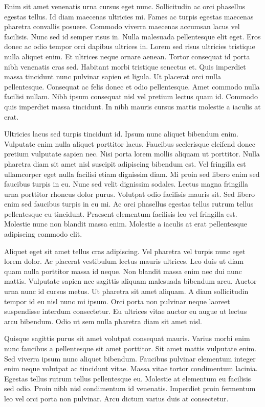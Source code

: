 Enim sit amet venenatis urna cursus eget nunc. Sollicitudin ac orci phasellus egestas tellus. Id diam maecenas ultricies mi. Fames ac turpis egestas maecenas pharetra convallis posuere. Commodo viverra maecenas accumsan lacus vel facilisis. Nunc sed id semper risus in. Nulla malesuada pellentesque elit eget. Eros donec ac odio tempor orci dapibus ultrices in. Lorem sed risus ultricies tristique nulla aliquet enim. Et ultrices neque ornare aenean. Tortor consequat id porta nibh venenatis cras sed. Habitant morbi tristique senectus et. Quis imperdiet massa tincidunt nunc pulvinar sapien et ligula. Ut placerat orci nulla pellentesque. Consequat ac felis donec et odio pellentesque. Amet commodo nulla facilisi nullam. Nibh ipsum consequat nisl vel pretium lectus quam id. Commodo quis imperdiet massa tincidunt. In nibh mauris cursus mattis molestie a iaculis at erat.

Ultricies lacus sed turpis tincidunt id. Ipsum nunc aliquet bibendum enim. Vulputate enim nulla aliquet porttitor lacus. Faucibus scelerisque eleifend donec pretium vulputate sapien nec. Nisi porta lorem mollis aliquam ut porttitor. Nulla pharetra diam sit amet nisl suscipit adipiscing bibendum est. Vel fringilla est ullamcorper eget nulla facilisi etiam dignissim diam. Mi proin sed libero enim sed faucibus turpis in eu. Nunc sed velit dignissim sodales. Lectus magna fringilla urna porttitor rhoncus dolor purus. Volutpat odio facilisis mauris sit. Sed libero enim sed faucibus turpis in eu mi. Ac orci phasellus egestas tellus rutrum tellus pellentesque eu tincidunt. Praesent elementum facilisis leo vel fringilla est. Molestie nunc non blandit massa enim. Molestie a iaculis at erat pellentesque adipiscing commodo elit.

Aliquet eget sit amet tellus cras adipiscing. Vel pharetra vel turpis nunc eget lorem dolor. Ac placerat vestibulum lectus mauris ultrices. Leo duis ut diam quam nulla porttitor massa id neque. Non blandit massa enim nec dui nunc mattis. Vulputate sapien nec sagittis aliquam malesuada bibendum arcu. Auctor urna nunc id cursus metus. Ut pharetra sit amet aliquam. A diam sollicitudin tempor id eu nisl nunc mi ipsum. Orci porta non pulvinar neque laoreet suspendisse interdum consectetur. Eu ultrices vitae auctor eu augue ut lectus arcu bibendum. Odio ut sem nulla pharetra diam sit amet nisl.

Quisque sagittis purus sit amet volutpat consequat mauris. Varius morbi enim nunc faucibus a pellentesque sit amet porttitor. Sit amet mattis vulputate enim. Sed viverra ipsum nunc aliquet bibendum. Faucibus pulvinar elementum integer enim neque volutpat ac tincidunt vitae. Massa vitae tortor condimentum lacinia. Egestas tellus rutrum tellus pellentesque eu. Molestie at elementum eu facilisis sed odio. Proin nibh nisl condimentum id venenatis. Imperdiet proin fermentum leo vel orci porta non pulvinar. Arcu dictum varius duis at consectetur.

